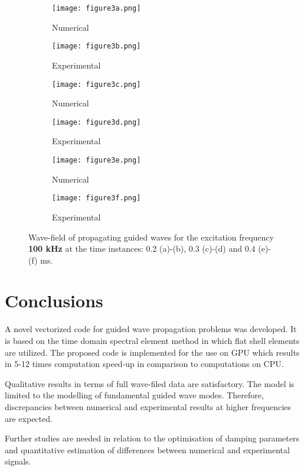 \documentclass[runningheads]{llncs}
\begin{document}
\begin{figure} [h!]
	\centering
	\begin{subfigure}[b]{0.49\textwidth}
		\centering
		\texttt{[image: figure3a.png]}
		\caption{Numerical}
		\label{fig:wavefield100a}
	\end{subfigure}
	\begin{subfigure}[b]{0.49\textwidth}
		\centering
		\texttt{[image: figure3b.png]}
		\caption{Experimental}
		\label{fig:wavefield100b}
	\end{subfigure}
	\begin{subfigure}[b]{0.49\textwidth}
		\centering
		\texttt{[image: figure3c.png]}
		\caption{Numerical}
		\label{fig:wavefield100c}
	\end{subfigure}
	\begin{subfigure}[b]{0.49\textwidth}
		\centering
		\texttt{[image: figure3d.png]}
		\caption{Experimental}
		\label{fig:wavefield100d}
	\end{subfigure}
	\begin{subfigure}[b]{0.49\textwidth}
		\centering
		\texttt{[image: figure3e.png]}
		\caption{Numerical}
		\label{fig:wavefield100e}
	\end{subfigure}
	\begin{subfigure}[b]{0.49\textwidth}
		\centering
		\texttt{[image: figure3f.png]}
		\caption{Experimental}
		\label{fig:wavefield100f}
	\end{subfigure}
	\caption{Wave-field of propagating guided waves for the excitation frequency \textbf{100 kHz} at the time instances:  0.2 (a)-(b), 0.3 (c)-(d) and 0.4 (e)-(f) ms. }
	\label{fig:wavefield100}
\end{figure}
\clearpage
\section{Conclusions}
A novel vectorized code for guided wave propagation problems was developed.
It is based on the time domain spectral element method in which flat shell elements are utilized.
The proposed code is implemented for the use on GPU which results in 5-12 times computation speed-up in comparison to computations on CPU.

Qualitative results in terms of full wave-filed data are satisfactory.
The model is limited to the modelling of fundamental guided wave modes.
Therefore, discrepancies between numerical and experimental results at higher frequencies are expected. 

Further studies are needed in relation to the optimisation of damping parameters and quantitative estimation of differences between numerical and experimental signals.
\end{document}
